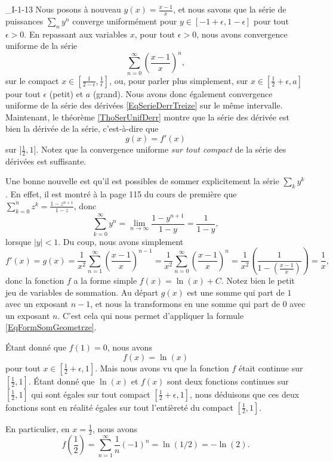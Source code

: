 \begin{corrige}{_I-1-13}
Nous posons à nouveau $y(x)=\frac{ x-1 }{ x }$, et nous savons que la série de puissances $\sum_ny^n$ converge uniformément pour $y\in[-1+\epsilon,1-\epsilon]$ pour tout $\epsilon>0$. En repassant aux variables $x$, pour tout $\epsilon>0$, nous avons convergence uniforme de la série 
\begin{equation}
	\sum_{n=0}^{\infty} \left( \frac{ x-1 }{ x } \right)^n, 
\end{equation}
sur le compact $x\in[\frac{ 1 }{ 2-\epsilon },\frac{1}{ \epsilon }]$, ou, pour parler plus simplement, sur $x\in[\frac{ 1 }{2}+\epsilon,a]$ pour tout $\epsilon$ (petit) et $a$ (grand). Nous avons donc également convergence uniforme de la série des dérivées \eqref{EqSerieDerrTreize} sur le même intervalle. Maintenant, le théorème \ref{ThoSerUnifDerr} montre que la série des dérivée est bien la dérivée de la série, c'est-à-dire que 
\begin{equation}
	g(x)=f'(x)
\end{equation}
sur $]\frac{ 1 }{ 2 },1]$. Notez que la convergence uniforme \emph{sur tout compact} de la série des dérivées est suffisante.

Une bonne nouvelle est qu'il est possibles de sommer explicitement la série $\sum_ky^k$. En effet, il est montré à la page 115 du cours de première que $\sum_{k=0}^n z^k=\frac{ 1-z^{n+1} }{ 1-z }$, donc
\begin{equation}		\label{EqFormSomGeometrze}
	\sum_{k=0}^{\infty}y^n=\lim_{n\to\infty}\frac{1-y^{n+1}}{ 1-y }=\frac{1}{ 1-y },
\end{equation}
lorsque $| y |<1$. Du coup, nous avons simplement
\begin{equation}
	f'(x)=g(x)=\frac{1}{ x^2 }\sum_{n=1}^{\infty}\left( \frac{ x-1 }{ x } \right)^{n-1}=\frac{1}{ x^2 }\sum_{n=0}^{\infty}\left( \frac{ x-1 }{ x } \right)^n=\frac{1}{ x^2 }\left( \frac{1}{  1-\left( \frac{ x-1 }{ x } \right)  } \right)=\frac{1}{ x },
\end{equation}
donc la fonction $f$ a la forme simple $f(x)=\ln(x)+C$. Notez bien le petit jeu de variables de sommation. Au départ $g(x)$ est une somme qui part de $1$ avec un exposant $n-1$, et nous la transformons en une somme qui part de $0$ avec un exposant $n$. C'est cela qui nous permet d'appliquer la formule \eqref{EqFormSomGeometrze}.

 Étant donné que $f(1)=0$, nous avons
\begin{equation}
	f(x)=\ln(x)
\end{equation}
pour tout $x\in[\frac{ 1 }{2}+\epsilon,1]$. Mais nous avons vu que la fonction $f$ était continue sur $[\frac{ 1 }{2},1]$. Étant donné que $\ln(x)$ et $f(x)$ sont deux fonctions continues sur $[\frac{ 1 }{2},1]$ qui sont égales sur tout compact $[\frac{ 1 }{2}+\epsilon,1]$, nous déduisons que ces deux fonctions sont en réalité égales sur tout l'entièreté du compact $[\frac{ 1 }{2},1]$.

En particulier, en $x=\frac{ 1 }{2}$, nous avons
\begin{equation}
	f(\frac{ 1 }{2})=\sum_{n=1}^{\infty}\frac{1}{ n }(-1)^n=\ln(1/2)=-\ln(2).
\end{equation}
\end{corrige}
